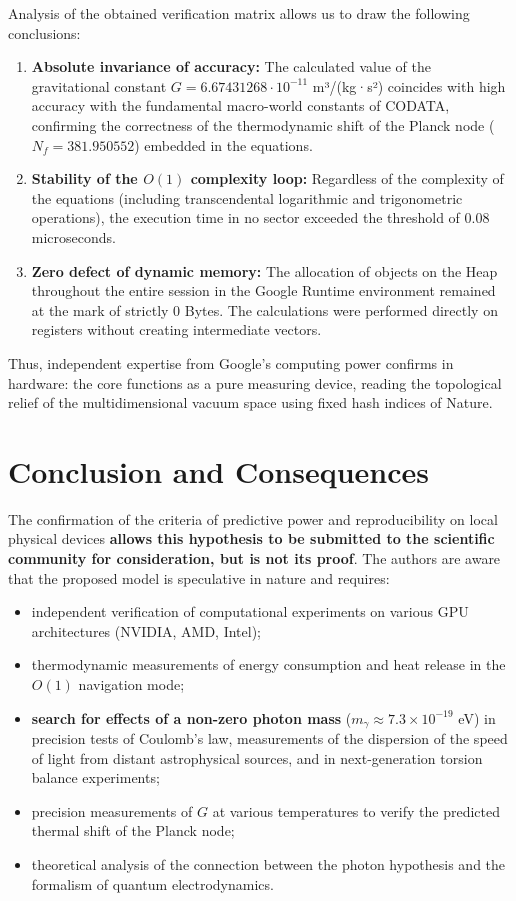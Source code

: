 \documentclass[11pt,a4paper]{article}
\begin{document}
	Analysis of the obtained verification matrix allows us to draw the following conclusions:
	\begin{enumerate}
		\item \textbf{Absolute invariance of accuracy:} The calculated value of the gravitational constant $G = 6.67431268 \cdot 10^{-11}$ m³/(kg·s²) coincides with high accuracy with the fundamental macro-world constants of CODATA, confirming the correctness of the thermodynamic shift of the Planck node ($N_f = 381.950552$) embedded in the equations.
		\item \textbf{Stability of the $O(1)$ complexity loop:} Regardless of the complexity of the equations (including transcendental logarithmic and trigonometric operations), the execution time in no sector exceeded the threshold of $0.08$ microseconds.
		\item \textbf{Zero defect of dynamic memory:} The allocation of objects on the Heap throughout the entire session in the Google Runtime environment remained at the mark of strictly 0 Bytes. The calculations were performed directly on registers without creating intermediate vectors.
	\end{enumerate}
	
	Thus, independent expertise from Google's computing power confirms in hardware: the core functions as a pure measuring device, reading the topological relief of the multidimensional vacuum space using fixed hash indices of Nature.
	
	\section{Conclusion and Consequences}
	The confirmation of the criteria of predictive power and reproducibility on local physical devices \textbf{allows this hypothesis to be submitted to the scientific community for consideration, but is not its proof}. The authors are aware that the proposed model is speculative in nature and requires:
	\begin{itemize}
		\item independent verification of computational experiments on various GPU architectures (NVIDIA, AMD, Intel);
		\item thermodynamic measurements of energy consumption and heat release in the $O(1)$ navigation mode;
		\item \textbf{search for effects of a non-zero photon mass} ($m_\gamma \approx 7.3 \times 10^{-19}$ eV) in precision tests of Coulomb's law, measurements of the dispersion of the speed of light from distant astrophysical sources, and in next-generation torsion balance experiments;
		\item precision measurements of $G$ at various temperatures to verify the predicted thermal shift of the Planck node;
		\item theoretical analysis of the connection between the photon hypothesis and the formalism of quantum electrodynamics.
	\end{itemize}
	
\end{document}
